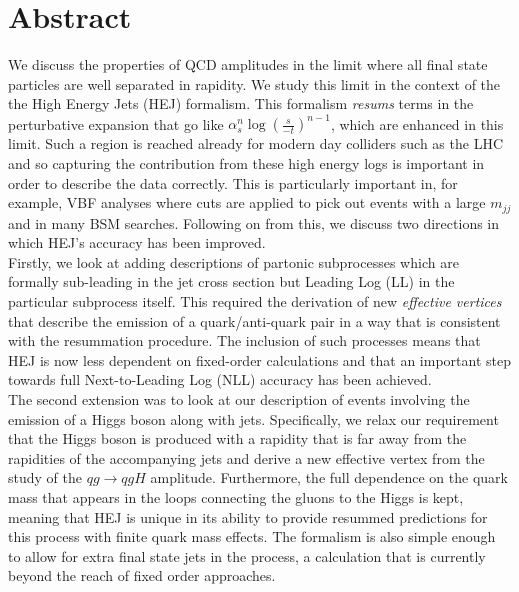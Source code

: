 \chapter{Abstract}

We discuss the properties of QCD amplitudes in the limit where all final state particles are well separated in rapidity. We study this limit in the context of the the High Energy Jets (HEJ) formalism. This formalism \emph{resums} terms in the perturbative expansion that go like $\alpha_s^n \log(\frac{s}{-t})^{n-1}$, which are enhanced in this limit. Such a region is reached already for modern day colliders such as the LHC and so capturing the contribution from these high energy logs is important in order to describe the data correctly. This is particularly important in, for example, VBF analyses where cuts are applied to pick out events with a large $m_{jj}$ and in many BSM searches. Following on from this, we discuss two directions in which HEJ's accuracy has been improved. \\
Firstly, we look at adding descriptions of partonic subprocesses which are formally sub-leading in the jet cross section but Leading Log (LL) in the particular subprocess itself. This required the derivation of new \emph{effective vertices} that describe the emission of a quark/anti-quark pair in a way that is consistent with the resummation procedure. The inclusion of such processes means that HEJ is now less dependent on fixed-order calculations and that an important step towards full Next-to-Leading Log (NLL) accuracy has been achieved. \\
The second extension was to look at our description of events involving the emission of a Higgs boson along with jets. Specifically, we relax our requirement that the Higgs boson is produced with a rapidity that is far away from the rapidities of the accompanying jets and derive a new effective vertex from the study of the $qg \to qgH$ amplitude. Furthermore, the full dependence on the quark mass that appears in the loops connecting the gluons to the Higgs is kept, meaning that HEJ is unique in its ability to provide resummed predictions for this process with finite quark mass effects. The formalism is also simple enough to allow for extra final state jets in the process, a calculation that is currently beyond the reach of fixed order approaches. 